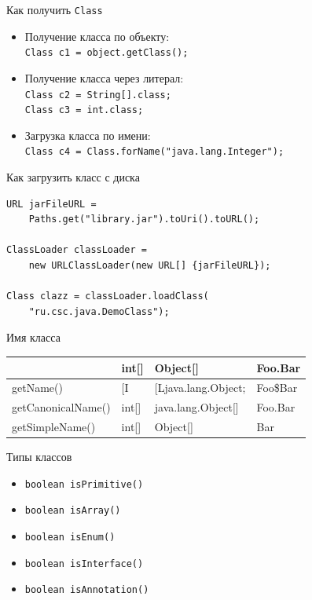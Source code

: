 \documentclass[unicode]{beamer}
\begin{document}
\begin{frame}{Как получить \texttt{Class}}
\begin{itemize}
\item Получение класса по объекту:\\
    \lstinline|Class c1 = object.getClass();|
    \bigskip

\item Получение класса через литерал:\\
    \lstinline|Class c2 = String[].class;|\\
    \lstinline|Class c3 = int.class;|
    \bigskip

\item Загрузка класса по имени:\\
    \lstinline|Class c4 = Class.forName("java.lang.Integer");|
\end{itemize}
\end{frame}


\begin{frame}[fragile]{Как загрузить класс с диска}
\begin{lstlisting}
URL jarFileURL = 
    Paths.get("library.jar").toUri().toURL();

ClassLoader classLoader = 
    new URLClassLoader(new URL[] {jarFileURL});

Class clazz = classLoader.loadClass(
    "ru.csc.java.DemoClass");
\end{lstlisting}
\end{frame}


\begin{frame}{Имя класса}
\begin{center}
\ttfamily
\begin{tabular}{l|l|l|l}
                    & int[]     & Object[]              & Foo.Bar \\\hline
getName()           & [I        & [Ljava.lang.Object;   & Foo\$Bar \\
getCanonicalName()  & int[]     & java.lang.Object[]    & Foo.Bar \\
getSimpleName()     & int[]     & Object[]              & Bar \\
\end{tabular}
\end{center}
\end{frame}


\begin{frame}{Типы классов}
\begin{itemize}
\item \lstinline|boolean isPrimitive()|
    \bigskip

\item \lstinline|boolean isArray()|
    \bigskip

\item \lstinline|boolean isEnum()|
    \bigskip

\item \lstinline|boolean isInterface()|
    \bigskip

\item \lstinline|boolean isAnnotation()|
\end{itemize}
\end{frame}
\end{document}
